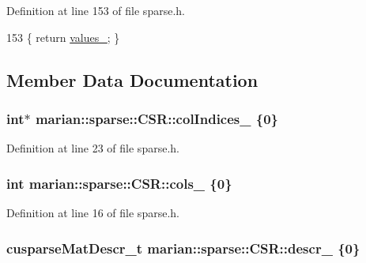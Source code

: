 Definition at line 153 of file sparse.\+h.


\begin{DoxyCode}
153 \{ \textcolor{keywordflow}{return} \hyperlink{classmarian_1_1sparse_1_1CSR_a10886b73b3ba7e2bb066b187345ba504}{values\_}; \}
\end{DoxyCode}


\subsection{Member Data Documentation}
\subsubsection[{\texorpdfstring{col\+Indices\+\_\+}{colIndices_}}]{\setlength{\rightskip}{0pt plus 5cm}int$\ast$ marian\+::sparse\+::\+C\+S\+R\+::col\+Indices\+\_\+ \{0\}\hspace{0.3cm}{\ttfamily [private]}}\hypertarget{classmarian_1_1sparse_1_1CSR_a258613537e03fd0fdaad0c8dd6188311}{}\label{classmarian_1_1sparse_1_1CSR_a258613537e03fd0fdaad0c8dd6188311}


Definition at line 23 of file sparse.\+h.

\subsubsection[{\texorpdfstring{cols\+\_\+}{cols_}}]{\setlength{\rightskip}{0pt plus 5cm}int marian\+::sparse\+::\+C\+S\+R\+::cols\+\_\+ \{0\}\hspace{0.3cm}{\ttfamily [private]}}\hypertarget{classmarian_1_1sparse_1_1CSR_a308d9860a310b4cac456780b705ede57}{}\label{classmarian_1_1sparse_1_1CSR_a308d9860a310b4cac456780b705ede57}


Definition at line 16 of file sparse.\+h.

\subsubsection[{\texorpdfstring{descr\+\_\+}{descr_}}]{\setlength{\rightskip}{0pt plus 5cm}cusparse\+Mat\+Descr\+\_\+t marian\+::sparse\+::\+C\+S\+R\+::descr\+\_\+ \{0\}\hspace{0.3cm}{\ttfamily [private]}}\hypertarget{classmarian_1_1sparse_1_1CSR_aefc692180153e470c2d6256eb4ec3f5b}{}\label{classmarian_1_1sparse_1_1CSR_aefc692180153e470c2d6256eb4ec3f5b}


